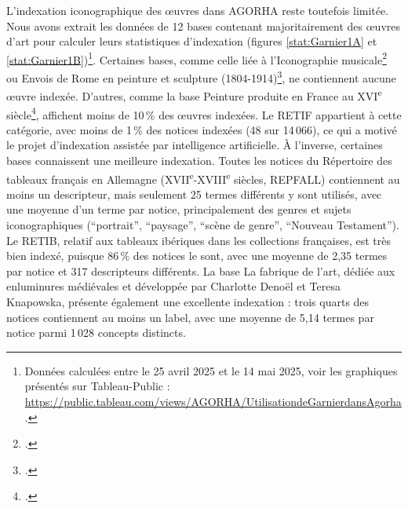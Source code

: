 L’indexation iconographique des œuvres dans AGORHA reste toutefois limitée. Nous avons extrait les données de 12 bases contenant majoritairement des œuvres d’art pour calculer leurs statistiques d’indexation (figures \ref{stat:Garnier1A} et \ref{stat:Garnier1B})\footnote{Données calculées entre le 25 avril 2025 et le 14 mai 2025, voir les graphiques présentés sur Tableau-Public : \url{https://public.tableau.com/views/AGORHA/UtilisationdeGarnierdansAgorha}.}. Certaines bases, comme celle liée à l’Iconographie musicale\footcite{institutnationaldhistoiredelartIconographieMusicaleRepertoire} ou Envois de Rome en peinture et sculpture (1804-1914)\footcite{institutnationaldhistoiredelartEnvoisRomePeinture}, ne contiennent aucune œuvre indexée. D’autres, comme la base Peinture produite en France au XVI\textsuperscript{e} siècle\footcite{institutnationaldhistoiredelartRecensementPeintureProduite}, affichent moins de 10 \% des œuvres indexées. Le RETIF appartient à cette catégorie, avec moins de 1 \% des notices indexées (48 sur 14 066), ce qui a motivé le projet d’indexation assistée par intelligence artificielle. À l’inverse, certaines bases connaissent une meilleure indexation. Toutes les notices du Répertoire des tableaux français en Allemagne (XVII\textsuperscript{e}-XVIII\textsuperscript{e} siècles, REPFALL) contiennent au moins un descripteur, mais seulement 25 termes différents y sont utilisés, avec une moyenne d’un terme par notice, principalement des genres et sujets iconographiques (“portrait”, “paysage”, “scène de genre”, “Nouveau Testament”). Le RETIB, relatif aux tableaux ibériques dans les collections françaises, est très bien indexé, puisque 86 \% des notices le sont, avec une moyenne de 2,35 termes par notice et 317 descripteurs différents. La base La fabrique de l’art, dédiée aux enluminures médiévales et développée par Charlotte Denoël et Teresa Knapowska, présente également une excellente indexation : trois quarts des notices contiennent au moins un label, avec une moyenne de 5,14 termes par notice parmi 1 028 concepts distincts.


